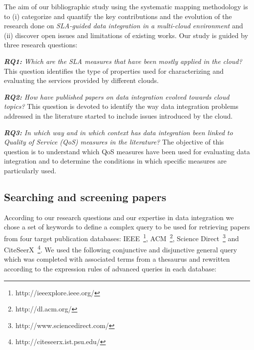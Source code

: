 
The aim of our bibliographic study using the systematic mapping methodology \cite{SM:Petersen:2008} is to (i) categorize and quantify the key contributions and the evolution of the research done on \textit{SLA-guided
data integration in a multi-cloud environment} and  (ii) discover open issues and limitations of existing works.    
Our study is guided by  three research questions:


\textit{\textbf{RQ1:} Which are the SLA measures that have been mostly
applied  in the cloud?} This question  identifies  the type of
properties used for characterizing and evaluating the services provided  by
different clouds. 
 
\textit{\textbf{RQ2:}  How have published papers on data
 integration evolved towards cloud topics?} This question is devoted to identify the way  data integration problems addressed in the literature started  to include issues introduced by the cloud.

\textit{\textbf{RQ3:} In which way and in which  context has data integration  been linked to Quality of Service (QoS) measures in the literature?} The objective of this question is to understand which QoS measures have been used for evaluating data integration and to determine the conditions in which  specific measures are particularly used.

\subsection{Searching and screening  papers} \label{subsec:search}

According to our research questions and our expertise in data integration we chose a set of keywords to define a complex query to be used for retrieving papers from four target publication databases: IEEE~\footnote{http://ieeexplore.ieee.org/},
ACM~\footnote{http://dl.acm.org/}, Science Direct~\footnote{http://www.sciencedirect.com/} and
CiteSeerX~\footnote{http://citeseerx.ist.psu.edu/}. We used the following conjunctive and disjunctive general query which was completed with associated terms from a thesaurus and rewritten according to the expression rules of advanced queries in each database: 





